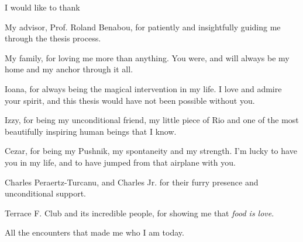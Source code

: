 I would like to thank 

My advisor, Prof. Roland Benabou, for patiently and insightfully guiding me through the thesis process. \par

My family, for loving me more than anything. You were, and will always be my home and my anchor through it all. \par

Ioana, for always being the magical intervention in my life. I love and admire your spirit, and this thesis would have not been possible without you. \par

Izzy, for being my unconditional friend, my little piece of Rio and one of the most beautifully inspiring human beings that I know. 

Cezar, for being my Pushnik, my spontaneity and my strength. I'm lucky to have you in my life, and to have jumped from that airplane with you. \par

Charles Peraertz-Turcanu, and Charles Jr. for their furry presence and unconditional support. \par

Terrace F. Club and its incredible people, for showing me that \textit{food is love}.\par

All the encounters that made me who I am today.

